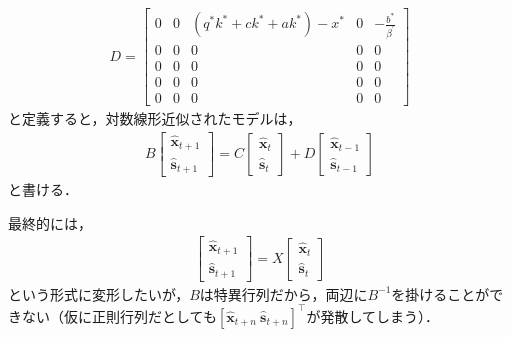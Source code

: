 \documentclass[dvipdfmx]{jlreq}
\begin{document}
\begin{align}
  D =
  \begin{bmatrix}
    0 & 0 & (q^* k^* + c k^* + a k^*) - x^* & 0 & -\frac{b^*}{\beta^\prime} \\
    0 & 0 & 0 & 0 & 0 \\
    0 & 0 & 0 & 0 & 0 \\
    0 & 0 & 0 & 0 & 0 \\
    0 & 0 & 0 & 0 & 0
  \end{bmatrix}
\end{align}
と定義すると，対数線形近似されたモデルは，
\begin{align} \label{eq:a}
  B
  \begin{bmatrix}
    \widehat{\boldsymbol{x}}_{t+1} \\
    \widehat{\boldsymbol{s}}_{t+1}
  \end{bmatrix}
  = C
  \begin{bmatrix}
    \widehat{\boldsymbol{x}}_{t} \\
    \widehat{\boldsymbol{s}}_{t}
  \end{bmatrix}
  + D
  \begin{bmatrix}
    \widehat{\boldsymbol{x}}_{t-1} \\
    \widehat{\boldsymbol{s}}_{t-1}
  \end{bmatrix}
\end{align}
と書ける．

最終的には，
\begin{align}
  \begin{bmatrix}
    \widehat{\boldsymbol{x}}_{t+1} \\
    \widehat{\boldsymbol{s}}_{t+1}
  \end{bmatrix}
  = X
  \begin{bmatrix}
    \widehat{\boldsymbol{x}}_{t} \\
    \widehat{\boldsymbol{s}}_{t}
  \end{bmatrix}
\end{align}
という形式に変形したいが，$B$は特異行列だから，両辺に$B^{-1}$を掛けることができない（仮に正則行列だとしても$[\widehat{\boldsymbol{x}}_{t+n} \ \widehat{\boldsymbol{s}}_{t+n}]^\top$が発散してしまう）．
\end{document}
